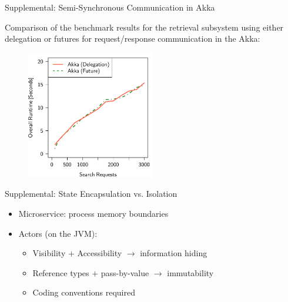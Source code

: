 \documentclass{beamer}
\begin{document}
\begin{frame}{Supplemental: Semi-Synchronous Communication in Akka}

Comparison of the benchmark results for the retrieval subsystem using either delegation or futures for request/response communication in the Akka:

\begin{center}
  \begin{figure} 
    \includegraphics[width=0.5\textwidth]{graphics/eval-search-comparison-akka-delegation-future.pdf} 
  \end{figure}
\end{center}

\end{frame}


\begin{frame}{Supplemental: State Encapsulation vs. Isolation}

\begin{itemize}
  \item Microservice: process memory boundaries
  \item Actors (on the JVM):
  \begin{itemize}
    \item Visibility $+$ Accessibility $\rightarrow$ information hiding
    \item Reference types $+$ pass-by-value $\rightarrow$ immutability
    \item Coding conventions required
  \end{itemize}
\end{itemize}

\end{frame}

\end{document}
